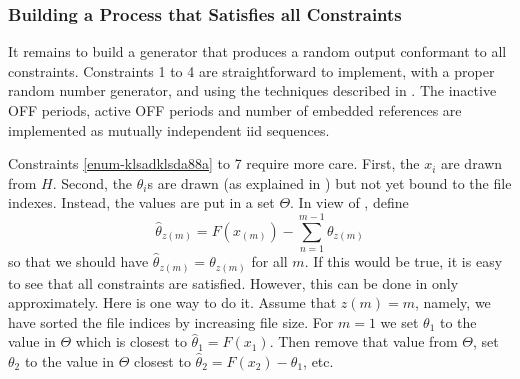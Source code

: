 \subsubsection{Building a Process that Satisfies all Constraints
} It remains to build a generator that produces a
random output conformant to all constraints.
Constraints 1 to 4 are straightforward to
implement, with a proper random number generator,
and using the techniques described in
. The inactive OFF periods,
active OFF periods and number of embedded
references are implemented as mutually
independent iid sequences.

Constraints \ref{enum-klsadklsda88a} to 7 require
more care. First, the $x_i$ are drawn from $H$.
Second, the $\theta_i$s are drawn (as explained
in ) but not yet bound to the file
indexes. Instead, the values are put in a set
$\Theta$. In view of ,
define
 $$
 \hat{\theta}_{z(m)}= F(x_{(m)})-\sum_{n=1}^{m-1}\theta_{z(m)}
 $$
 so that we should have $\hat{\theta}_{z(m)}=\theta_{z(m)}$ for all $m$. If this would be true, it is easy to
 see that all constraints are satisfied. However, this can be done in \cite{surge-98} only approximately. Here is one way to do
 it. Assume that $z(m)=m$, namely, we have sorted the file indices by increasing file size.
 For $m=1$ we set $\theta_1$ to the value in $\Theta$ which is closest to
 $\hat{\theta}_1=F(x_1)$. Then remove that value from $\Theta$, set $\theta_2$ to the value in
$\Theta$ closest to
$\hat{\theta}_2=F(x_2)-\theta_1$, etc.


